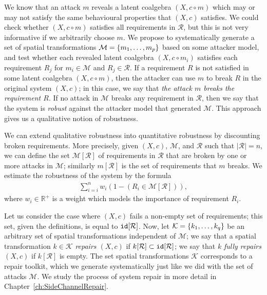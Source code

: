 We know that an attack $m$ reveals a latent coalgebra $(X, c\circ m)$ which may or may not satisfy the same behavioural properties that $(X, c)$ satisfies. We could check whether $(X,c\circ m)$ satisfies all requirements in $\mathcal{R}$, but this is not very informative if we arbitrarily choose $m$. We propose to systematically generate a set of spatial transformations $\mathcal{M}=\left\{m_1,\ldots, m_p\right\}$ based on some attacker model, and test whether each revealed latent coalgebra $(X, c\circ m_i)$ satisfies each requirement $R_j$ for $m_i\in \mathcal{M}$ and $R_j\in \mathcal{R}$. If a requirement $R$ is not satisfied in some latent coalgebra $(X, c\circ m)$, then the attacker can use $m$ to break $R$ in the original system $(X,c)$; in this case, we say that \emph{the attack $m$ breaks the requirement $R$}. If no attack in $\mathcal{M}$ breaks any requirement in $\mathcal{R}$, then we say that the system is \emph{robust} against the attacker model that generated $\mathcal{M}$. This approach gives us a qualitative notion of robustness.

We can extend qualitative robustness into quantitative robustness by discounting broken requirements. More precisely, given $(X,c)$, $\mathcal{M}$, and $\mathcal{R}$ such that $|\mathcal{R}|=n$, we can define the set $\mathcal{M}[\mathcal{R}]$ of requirements in $\mathcal{R}$ that are broken by one or more attacks in $\mathcal{M}$; similarly $m[\mathcal{R}]$ is the set of requirements that $m$ breaks. We estimate the robustness of the system by the formula 
\begin{align*}
    \sum_{i=i}^n{w_i(1-(R_i\in \mathcal{M}[\mathcal{R}]))},
\end{align*}
where $w_i\in \mathbb{R}^+$ is a weight which models the importance of requirement $R_i$.

Let us consider the case where $(X,c)$ fails a non-empty set of requirements; this set, given the definitions, is equal to ${\texttt{id}}[\mathcal{R}]$. Now, let $\mathcal{K}=\left\{k_1, \ldots, k_q\right\}$ be an arbitrary set of spatial transformations independent of $\mathcal{M}$; we say that a spatial transformation $k\in \mathcal{K}$ \emph{repairs $(X,c)$} if $k[\mathcal{R}]\subset {\texttt{id}}[\mathcal{R}]$; we say that $k$ \emph{fully repairs $(X,c)$} if $k[\mathcal{R}]$ is empty. The set spatial transformations $\mathcal{K}$ corresponds to a repair toolkit, which we generate systematically just like we did with the set of attacks $\mathcal{M}$. We study the process of system repair in more detail in Chapter~\ref{ch:SideChannelRepair}.

